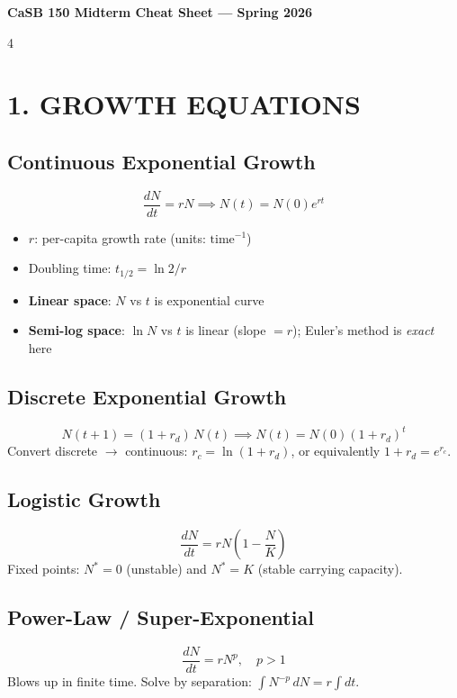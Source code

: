 \documentclass[8pt,landscape]{article}
\begin{document}
\footnotesize

\begin{center}
  {\small\textbf{CaSB 150 Midterm Cheat Sheet --- Spring 2026}}
\end{center}
\vspace{-4pt}

\begin{multicols}{4}

\section{1. GROWTH EQUATIONS}

\subsection{Continuous Exponential Growth}
\[
\frac{dN}{dt} = rN \implies N(t) = N(0)e^{rt}
\]
\begin{itemize}
  \item $r$: per-capita growth rate (units: $\text{time}^{-1}$)
  \item Doubling time: $t_{1/2} = \ln 2 / r$
  \item \textbf{Linear space}: $N$ vs $t$ is exponential curve
  \item \textbf{Semi-log space}: $\ln N$ vs $t$ is linear (slope $= r$); Euler's method is \emph{exact} here
\end{itemize}

\subsection{Discrete Exponential Growth}
\[
N(t+1) = (1+r_d)\,N(t) \implies N(t) = N(0)(1+r_d)^t
\]
Convert discrete $\to$ continuous: $r_c = \ln(1 + r_d)$, or equivalently $1 + r_d = e^{r_c}$.

\subsection{Logistic Growth}
\[
\frac{dN}{dt} = rN\!\left(1 - \frac{N}{K}\right)
\]
Fixed points: $N^* = 0$ (unstable) and $N^* = K$ (stable carrying capacity).

\subsection{Power-Law / Super-Exponential}
\[
\frac{dN}{dt} = r N^p, \quad p > 1
\]
Blows up in finite time. Solve by separation: $\int N^{-p}\,dN = r\int dt$.


\end{multicols}
\end{document}
